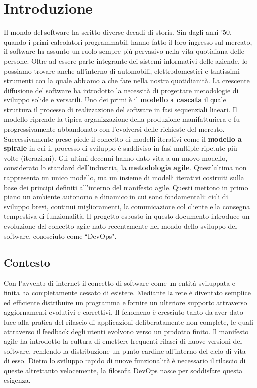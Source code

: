 \chapter{Introduzione}
\label{chap:introduction}

Il mondo del software ha scritto diverse decadi di storia. Sin dagli anni '50, quando i primi calcolatori programmabili hanno fatto il loro ingresso sul mercato, il software ha assunto un ruolo sempre più pervasivo nella vita quotidiana delle persone. Oltre ad essere parte integrante dei sistemi informativi delle aziende, lo possiamo trovare anche all'interno di automobili, elettrodomestici e tantissimi strumenti con la quale abbiamo a che fare nella nostra quotidianità. La crescente diffusione del software ha introdotto la necessità di progettare metodologie di sviluppo solide e versatili. Uno dei primi è il \textbf{modello a cascata} il quale struttura il processo di realizzazione del software in fasi sequenziali lineari. Il modello riprende la tipica organizzazione della produzione manifatturiera e fu progressivamente abbandonato con l'evolversi delle richieste del mercato. Successivamente prese piede il concetto di modelli iterativi come il \textbf{modello a spirale} in cui il processo di sviluppo è suddiviso in fasi multiple ripetute più volte (iterazioni). Gli ultimi decenni hanno dato vita a un nuovo modello, considerato lo standard dell'industria, la \textbf{metodologia agile}. Quest'ultima non rappresenta un unico modello, ma un insieme di modelli iterativi costruiti sulla base dei principi definiti all'interno del manifesto agile. Questi mettono in primo piano un ambiente autonomo e dinamico in cui sono fondamentali: cicli di sviluppo brevi, continui miglioramenti, la comunicazione col cliente e la consegna tempestiva di funzionalità. Il progetto esposto in questo documento introduce un evoluzione del concetto agile nato recentemente nel mondo dello sviluppo del software, conosciuto come ``DevOps".

\section{Contesto}

Con l'avvento di internet il concetto di software come un entità sviluppata e finita ha completamente cessato di esistere. Mediante la rete è diventato semplice ed efficiente distribuire un programma e fornire un ulteriore supporto attraverso aggiornamenti evolutivi e correttivi. Il fenomeno è cresciuto tanto da aver dato luce alla pratica del rilascio di applicazioni deliberatamente non complete, le quali attraverso il feedback degli utenti evolvono verso un prodotto finito. Il manifesto agile ha introdotto la cultura di emettere frequenti rilasci di nuove versioni del software, rendendo la distribuzione un punto cardine all'interno del ciclo di vita di esso. Dietro lo sviluppo rapido di nuove funzionalità è necessario il rilascio di queste altrettanto velocemente, la filosofia DevOps nasce per soddisfare questa esigenza.

